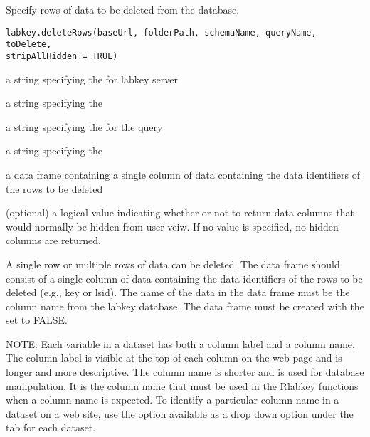 \documentclass{book}
\begin{document}
\begin{Description}\relax
Specify rows of data to be deleted from the database.
\end{Description}
\begin{Usage}
\begin{verbatim}
labkey.deleteRows(baseUrl, folderPath, schemaName, queryName, toDelete, 
stripAllHidden = TRUE)
\end{verbatim}
\end{Usage}
\begin{Arguments}
\begin{ldescription}
\item[\code{baseUrl}] a string specifying the for labkey server
\item[\code{folderPath}] a string specifying the 
\item[\code{schemaName}] a string specifying the   for the query
\item[\code{queryName}] a string specifying the  
\item[\code{toDelete}] a data frame containing a single column of data containing the data identifiers of the rows to be deleted
\item[\code{stripAllHidden}] (optional) a logical value indicating whether or not to return data columns that would 
normally be hidden from user veiw. If no value is specified, no hidden columns are returned.
\end{ldescription}
\end{Arguments}
\begin{Details}\relax
A single row or multiple rows of data can be deleted.  The  data frame should consist of a single 
column of data containing the data identifiers of the rows to be deleted (e.g., key or lsid).
The name of the data in the data frame must be the column name from the labkey database.
The data frame must be created with the  set to FALSE.

NOTE: Each variable in a dataset has both a column label and a column name. The column label is visible at the top
of each column on the web page and is longer and more descriptive. The column name is shorter and is 
used  for database manipulation. It is the column name that must be used in
the Rlabkey functions when a column name is expected. To identify a particular column name in a dataset on
a web site, use the  option available as a drop down option under the  
tab for each dataset.
\end{Details}
\end{document}
